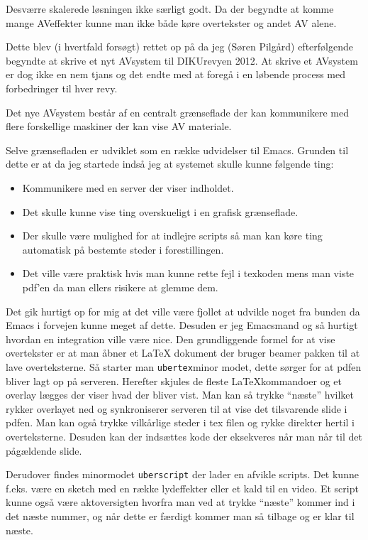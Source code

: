 \documentclass[10pt,a4paper,danish]{article}
\begin{document}
Desværre skalerede løsningen ikke særligt godt. Da der begyndte at komme mange
AVeffekter kunne man ikke både køre overtekster og andet AV alene.

Dette blev (i hvertfald forsøgt) rettet op på da jeg (Søren Pilgård) efterfølgende begyndte at skrive et nyt
AVsystem til DIKUrevyen 2012.
At skrive et AVsystem er dog ikke en nem tjans og det endte med at foregå i en
løbende process med forbedringer til hver revy.

Det nye AVsystem består af en centralt grænseflade der kan kommunikere med flere
forskellige maskiner der kan vise AV materiale.

Selve grænsefladen er udviklet som en række udvidelser til Emacs.
Grunden til dette er at da jeg startede indså jeg at systemet skulle kunne
følgende ting:
\begin{itemize}
\item Kommunikere med en server der viser indholdet.
\item Det skulle kunne vise ting overskueligt i en grafisk grænseflade.
\item Der skulle være mulighed for at indlejre scripts så man kan køre ting
  automatisk på bestemte steder i forestillingen.
\item Det ville være praktisk hvis man kunne rette fejl i texkoden mens man
  viste pdf'en da man ellers risikere at glemme dem.
\end{itemize}

Det gik hurtigt op for mig at det ville være fjollet at udvikle noget fra bunden
da Emacs i forvejen kunne meget af dette. Desuden er jeg Emacsmand og så hurtigt
hvordan en integration ville være nice.
Den grundliggende formel for at vise overtekster er at man åbner et LaTeX
dokument der bruger beamer pakken til at lave overteksterne. Så starter man
\texttt{ubertex}minor modet, dette sørger for at pdfen bliver lagt op på
serveren. Herefter skjules de fleste LaTeXkommandoer og et overlay lægges der
viser hvad der bliver vist. Man kan så trykke ``næste'' hvilket rykker overlayet ned
og synkroniserer serveren til at vise det tilsvarende slide i pdfen.
Man kan også trykke vilkårlige steder i tex filen og rykke direkter hertil i
overteksterne. Desuden kan der indsættes kode der eksekveres når man når til det
pågældende slide.


Derudover findes minormodet \texttt{uberscript} der lader en afvikle scripts.
Det kunne f.eks. være en sketch med en række lydeffekter eller et kald til en video.
Et script kunne også være aktoversigten hvorfra man ved at trykke ``næste''
kommer ind i det næste nummer, og når dette er færdigt kommer man så tilbage og
er klar til næste.
\end{document}
